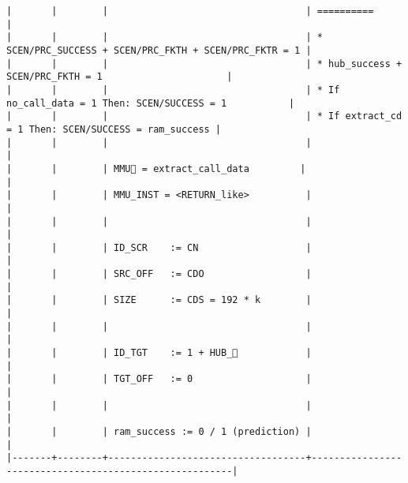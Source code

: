 \documentclass[varwidth=\maxdimen,margin=0.5cm,multi={verbatim}]{standalone}
\begin{document}
\begin{verbatim}
|       |        |                                   | ==========                                             |
|       |        |                                   | * SCEN/PRC_SUCCESS + SCEN/PRC_FKTH + SCEN/PRC_FKTR = 1 |
|       |        |                                   | * hub_success + SCEN/PRC_FKTH = 1                      |
|       |        |                                   | * If no_call_data = 1 Then: SCEN/SUCCESS = 1           |
|       |        |                                   | * If extract_cd   = 1 Then: SCEN/SUCCESS = ram_success |
|       |        |                                   |                                                        |
|       |        | MMU🏴 = extract_call_data         |                                                        |
|       |        | MMU_INST = <RETURN_like>          |                                                        |
|       |        |                                   |                                                        |
|       |        | ID_SCR    := CN                   |                                                        |
|       |        | SRC_OFF   := CDO                  |                                                        |
|       |        | SIZE      := CDS = 192 * k        |                                                        |
|       |        |                                   |                                                        |
|       |        | ID_TGT    := 1 + HUB_            |                                                        |
|       |        | TGT_OFF   := 0                    |                                                        |
|       |        |                                   |                                                        |
|       |        | ram_success := 0 / 1 (prediction) |                                                        |
|-------+--------+-----------------------------------+--------------------------------------------------------|
\end{verbatim}
\end{document}
